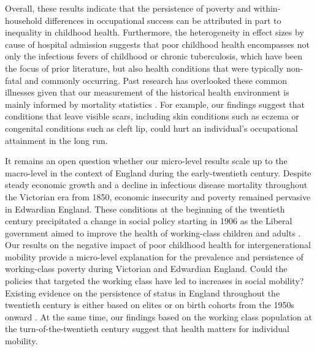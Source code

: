 \documentclass[12pt,english]{article}
\begin{document}
Overall, these results indicate that the persistence of poverty and within-household differences in occupational success can be attributed in part to inequality in childhood health. Furthermore, the heterogeneity in effect sizes by cause of hospital admission suggests that poor childhood health encompasses not only the infectious fevers of childhood or chronic tuberculosis, which have been the focus of prior literature, but also health conditions that were typically non-fatal and commonly occurring. Past research has overlooked these common illnesses given that our measurement of the historical health environment is mainly informed by mortality statistics \citep{Hardy2001}. For example, our findings suggest that conditions that leave visible scars, including skin conditions such as eczema or congenital conditions such as cleft lip, could hurt an individual's occupational attainment in the long run.

It remains an open question whether our micro-level results scale up to the macro-level in the context of England during the early-twentieth century. Despite steady economic growth and a decline in infectious disease mortality throughout the Victorian era from 1850, economic insecurity and poverty remained pervasive in Edwardian England. These conditions at the beginning of the twentieth century precipitated a change in social policy starting in 1906 as the Liberal government aimed to improve the health of working-class children and adults \citep{Boyer2019}. Our results on the negative impact of poor childhood health for intergenerational mobility provide a micro-level explanation for the prevalence and persistence of working-class poverty during Victorian and Edwardian England. Could the policies that targeted the working class have led to increases in social mobility? Existing evidence on the persistence of status in England throughout the twentieth century is either based on elites \citep{ClarkCummins2015} or on birth cohorts from the 1950s onward \citep{DMR1997}. At the same time, our findings based on the working class population at the turn-of-the-twentieth century suggest that health matters for individual mobility. 
\end{document}
